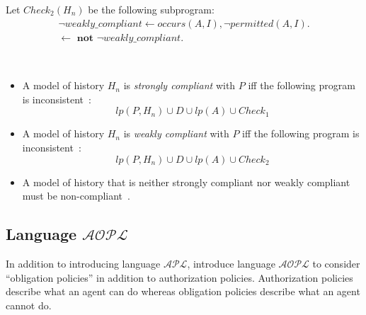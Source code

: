 Let $Check_2(H_n)$ be the following subprogram:
\begin{gather*}
    \neg weakly\_compliant \leftarrow occurs(A, I), \neg permitted(A, I). \\
    \leftarrow \textbf{ not } \neg weakly\_compliant.
\end{gather*}

\begin{definition}
    \label{def:authorization_event_compliance_history_knowledge}
    ~

    \begin{itemize}
        \item A model of history $H_n$ is \textit{strongly compliant} with $P$ iff the following program is inconsistent~\citep{gelfond_authorization_2008}:
            \[
                lp(P, H_n) \cup D \cup lp(A) \cup Check_1
            \]
        \item A model of history $H_n$ is \textit{weakly compliant} with $P$ iff the following program is inconsistent~\citep{gelfond_authorization_2008}:
            \[
                lp(P, H_n) \cup D \cup lp(A) \cup Check_2
            \]
        \item A model of history that is neither strongly compliant nor weakly compliant must be non-compliant~\citep{gelfond_authorization_2008}.
    \end{itemize}
\end{definition}

%

%






\subsection{Language $\mathcal{AOPL}$}

In addition to introducing language $\mathcal{APL}$, \citet{gelfond_authorization_2008} introduce language $\mathcal{AOPL}$ to consider ``obligation policies'' in addition to authorization policies.
Authorization policies describe what an agent can do whereas obligation policies describe what an agent cannot do.

